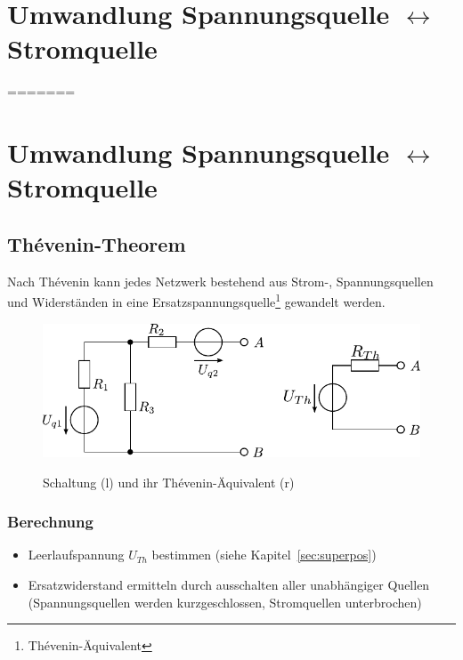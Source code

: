 



\section{Umwandlung Spannungsquelle $\leftrightarrow$ Stromquelle}
=======
\section{Umwandlung Spannungsquelle $\leftrightarrow$ Stromquelle}

\subsection{Thévenin-Theorem}
Nach Thévenin kann jedes Netzwerk bestehend aus Strom-, Spannungsquellen und Widerständen in eine Ersatzspannungsquelle\footnote{Thévenin-Äquivalent} gewandelt werden.

\begin{figure}[h!]
\centering
\includegraphics[scale=\schscale]{thevenin_sch_2.pdf}
\label{sch:thevenin}
\caption{Schaltung (l) und ihr Thévenin-Äquivalent (r)}
\end{figure}

\subsubsection{Berechnung}
\begin{itemize}
\item Leerlaufspannung $U_{Th}$ bestimmen (siehe Kapitel~\ref{sec:superpos})
\item Ersatzwiderstand ermitteln durch ausschalten aller unabhängiger Quellen (Spannungsquellen werden kurzgeschlossen, Stromquellen unterbrochen)
\end{itemize}


